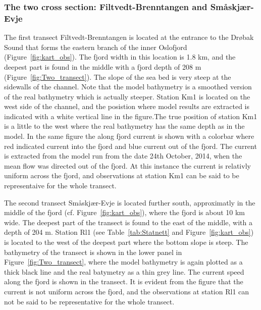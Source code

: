 \clearpage
\subsubsection{The two cross section: Filtvedt-Brenntangen and Sm{\aa}skj{\ae}r-Evje}
\label{subsubsec:filtve}
The first transect Filtvedt-Brenntangen is located at the entrance to the Dr{\o}bak Sound that forms the eastern branch of the inner Oslofjord (Figure~\ref{fig:kart_obs}). The fjord width in this location is 1.8 km, and the deepest part is found in the middle with a fjord depth of 208 m (Figure~\ref{fig:Two_transect}). The slope of the sea bed is very steep at the sidewalls of the channel. Note that the model bathymetry is a smoothed version of the real bathymetry which is actually steeper. Station Km1 is located on the west side of the channel, and the posistion where model results are extracted is indicated with a white vertical line in the figure.The true position of station Km1 is a little to the west where the real bathymetry has the same depth as in the model. In the same figure the along fjord current is shown with a colorbar where red indicated current into the fjord and blue current out of the fjord. The current is extracted from the model run from the date 24th October, 2014, when the mean flow was directed out of the fjord. At this instance the current is relativly uniform across the fjord, and observations at station Km1 can be said to be representaive for the whole transect.

The second transect Sm{\aa}skj{\ae}r-Evje is located further south, approximatly in the middle of the fjord (cf. Figure~\ref{fig:kart_obs}), where the fjord is about 10 km wide. The deepest part of the transect is found to the east of the middle, with a depth of 204 m. Station Rl1 (see Table~\ref{tab:Statnett} and Figure~\ref{fig:kart_obs}) is located to the west of the deepest part where the bottom slope is steep. The bathymetry of the transect is shown in the lower panel in Figure~\ref{fig:Two_transect}, where the model bathymetry is again plotted as a thick black line and the real batymetry as a thin grey line. The current speed along the fjord is shown in the transect. It is evident from the figure that the current is not uniform across the fjord, and the observations at station Rl1 can not be said to be representative for the whole transect.

\clearpage 

